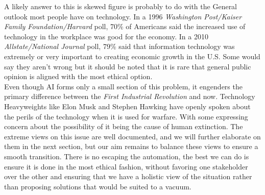 	A likely answer to this is skewed figure is probably to do with the General outlook most people have on technology. In a 1996 \textit{Washington Post/Kaiser Family Foundation/Harvard} poll, 70\% of Americans said the increased use of technology in the workplace was good for the economy. In a 2010 \textit{Allstate/National Journal} poll, 79\% said that information technology was extremely or very important to creating economic growth in the U.S. Some would say they aren't wrong but it should be noted that it is rare that general public opinion is aligned with the most ethical option.\\
	Even though AI forms only a small section of this problem, it engenders the primary difference between the \textit{First Industrial Revolution} and now. Technology Heavyweights like Elon Musk and Stephen Hawking have openly spoken about the perils of the technology when it is used for warfare\cite{aidangers}. With some expressing concern about the possibility of it being the cause of human extinction. The extreme views on this issue are well documented, and we will further elaborate on them in the next section, but our aim remains to balance these views to ensure a smooth transition. There is no escaping the automation, the best we can do is ensure it is done in the most ethical fashion, without favoring one stakeholder over the other and ensuring that we have a holistic view of the situation rather than proposing solutions that would be suited to a vacuum.


